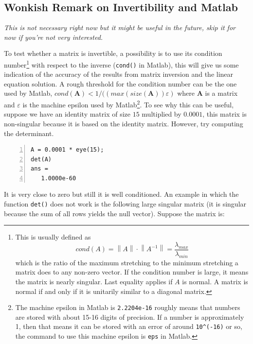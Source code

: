 \documentclass[a4paper,11pt]{article}
\begin{document}
\subsection{Wonkish Remark on Invertibility and Matlab}

\textit{This is not necessary right now but it might be useful in the future, skip it for now if you're not very interested.}

To test whether a matrix is invertible, a possibility is to use its condition number\footnote{This is usually defined as \[cond(A) = \left\lVert A \right\rVert \cdot \left\lVert A^{-1} \right\rVert = \frac{\lambda_{max}}{\lambda_{min}}\] which is the ratio of the maximum stretching to the minimum stretching a matrix does to any non-zero vector. If the condition number is large, it means the matrix is nearly singular. Last equality applies if $A$ is normal. A matrix is normal if and only if it is unitarily similar to a diagonal matrix.} with respect to the inverse (\verb;cond(); in Matlab), this will give us some indication of the accuracy of the results from matrix inversion and the linear equation solution. A rough threshold for the condition number can be the one used by Matlab, $cond(\mathbf{A}) < 1/((max(size(\mathbf{A}))\varepsilon)$ where $\mathbf{A}$ is a matrix and $\varepsilon$ is the machine epsilon used by Matlab\footnote{The machine epsilon in Matlab is \verb;2.2204e-16; roughly means that numbers are stored with about 15-16 digits of precision. If a number is approximately 1, then that means it can be stored with an error of around \verb;10^(-16); or so, the command to use this machine epsilon is \verb;eps; in Matlab.}. To see why this can be useful, suppose we have an identity matrix of size $15$ multiplied by $0.0001$, this matrix is non-singular because it is based on the identity matrix. However, try computing the determinant.

\begin{Verbatim}[numbers=left, fontsize = \small]
A = 0.0001 * eye(15);
det(A)
ans =
   1.0000e-60
\end{Verbatim}

It is very close to zero but still it is well conditioned. An example in which the function \verb+det()+ does not work is the following large singular matrix (it is singular because the sum of all rows yields the null vector). Suppose the matrix is:
\end{document}
